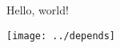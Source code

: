 \documentclass{article}
\begin{document}
Hello, world!

\texttt{[image: ../depends]}
\end{document}
